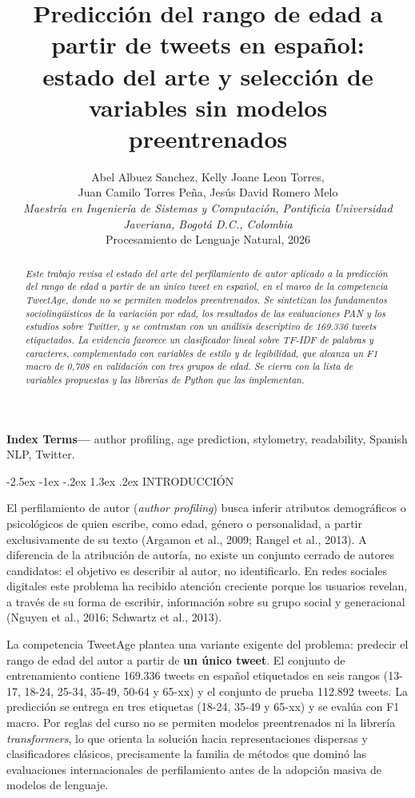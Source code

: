 \documentclass[10pt,twocolumn]{article}
\title{\textbf{Predicción del rango de edad a partir de tweets en español:\\
estado del arte y selección de variables sin modelos preentrenados}}
\author{Abel Albuez Sanchez, Kelly Joane Leon Torres,\\
Juan Camilo Torres Peña, Jesús David Romero Melo\\
\small\textit{Maestría en Ingeniería de Sistemas y Computación, Pontificia Universidad Javeriana, Bogotá D.C., Colombia}\\
\small Procesamiento de Lenguaje Natural, 2026}
\date{}
\makeatletter
\renewcommand{\section}{\@startsection{section}{1}{\z@}%
  {-2.5ex \@plus -1ex \@minus -.2ex}%
  {1.3ex \@plus .2ex}%
  {\normalfont\large\bfseries\centering}}
\makeatother
\begin{document}
\maketitle
\begin{abstract}
\textit{Este trabajo revisa el estado del arte del perfilamiento de autor aplicado a la predicción
del rango de edad a partir de un único tweet en español, en el marco de la competencia TweetAge,
donde no se permiten modelos preentrenados. Se sintetizan los fundamentos sociolingüísticos de la
variación por edad, los resultados de las evaluaciones PAN y los estudios sobre Twitter, y se
contrastan con un análisis descriptivo de 169.336 tweets etiquetados. La evidencia favorece un
clasificador lineal sobre TF-IDF de palabras y caracteres, complementado con variables de estilo y
de legibilidad, que alcanza un F1 macro de 0,708 en validación con tres grupos de edad. Se cierra
con la lista de variables propuestas y las librerías de Python que las implementan.}
\end{abstract}

\noindent\textbf{Index Terms---} author profiling, age prediction, stylometry, readability,
Spanish NLP, Twitter.

\section{INTRODUCCIÓN}\label{sec:1}

El perfilamiento de autor (\textit{author profiling}) busca inferir atributos demográficos o psicológicos de quien escribe, como edad, género o personalidad, a partir exclusivamente de su texto (Argamon et al., 2009; Rangel et al., 2013). A diferencia de la atribución de autoría, no existe un conjunto cerrado de autores candidatos: el objetivo es describir al autor, no identificarlo. En redes sociales digitales este problema ha recibido atención creciente porque los usuarios revelan, a través de su forma de escribir, información sobre su grupo social y generacional (Nguyen et al., 2016; Schwartz et al., 2013).

La competencia TweetAge plantea una variante exigente del problema: predecir el rango de edad del autor a partir de \textbf{un único tweet}. El conjunto de entrenamiento contiene 169.336 tweets en español etiquetados en seis rangos (13-17, 18-24, 25-34, 35-49, 50-64 y 65-xx) y el conjunto de prueba 112.892 tweets. La predicción se entrega en tres etiquetas (18-24, 35-49 y 65-xx) y se evalúa con F1 macro. Por reglas del curso no se permiten modelos preentrenados ni la librería \textit{transformers}, lo que orienta la solución hacia representaciones dispersas y clasificadores clásicos, precisamente la familia de métodos que dominó las evaluaciones internacionales de perfilamiento antes de la adopción masiva de modelos de lenguaje.
\end{document}
